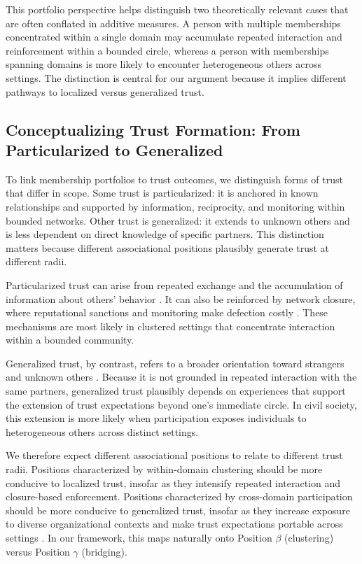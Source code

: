 This portfolio perspective helps distinguish two theoretically relevant cases that are often conflated in additive measures. A person with multiple memberships concentrated within a single domain may accumulate repeated interaction and reinforcement within a bounded circle, whereas a person with memberships spanning domains is more likely to encounter heterogeneous others across settings. The distinction is central for our argument because it implies different pathways to localized versus generalized trust.

\subsection{Conceptualizing Trust Formation: From Particularized to Generalized}

To link membership portfolios to trust outcomes, we distinguish forms of trust that differ in scope. Some trust is particularized: it is anchored in known relationships and supported by information, reciprocity, and monitoring within bounded networks. Other trust is generalized: it extends to unknown others and is less dependent on direct knowledge of specific partners. This distinction matters because different associational positions plausibly generate trust at different radii.

Particularized trust can arise from repeated exchange and the accumulation of information about others' behavior \parencite{blau_exchange_1986, kollock_emergence_1994}. It can also be reinforced by network closure, where reputational sanctions and monitoring make defection costly \parencite{coleman_foundations_2000, portes_embeddedness_1993}. These mechanisms are most likely in clustered settings that concentrate interaction within a bounded community.

Generalized trust, by contrast, refers to a broader orientation toward strangers and unknown others \parencite{uslaner_moral_2001, hardin_conceptions_2001}. Because it is not grounded in repeated interaction with the same partners, generalized trust plausibly depends on experiences that support the extension of trust expectations beyond one's immediate circle. In civil society, this extension is more likely when participation exposes individuals to heterogeneous others across distinct settings.

We therefore expect different associational positions to relate to different trust radii. Positions characterized by within-domain clustering should be more conducive to localized trust, insofar as they intensify repeated interaction and closure-based enforcement. Positions characterized by cross-domain participation should be more conducive to generalized trust, insofar as they increase exposure to diverse organizational contexts and make trust expectations portable across settings \parencite{hedstrom_dissecting_2005, glanville_why_2016}. In our framework, this maps naturally onto Position $\beta$ (clustering) versus Position $\gamma$ (bridging).



